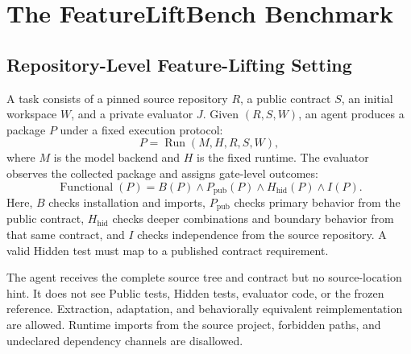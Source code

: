 \section{The FeatureLiftBench Benchmark}
\label{sec:benchmark}

\subsection{Repository-Level Feature-Lifting Setting}

A task consists of a pinned source repository $R$, a public contract $S$, an
initial workspace $W$, and a private evaluator $J$. Given $(R,S,W)$, an agent
produces a package $P$ under a fixed execution protocol:
\begin{equation}
  P = \operatorname{Run}(M, H, R, S, W),
  \label{eq:run}
\end{equation}
where $M$ is the model backend and $H$ is the fixed \mainprotocol runtime. The
evaluator observes the collected package and assigns gate-level outcomes:
\begin{equation}
  \operatorname{Functional}(P)
  = B(P) \land P_{\mathrm{pub}}(P)
    \land H_{\mathrm{hid}}(P) \land I(P).
  \label{eq:functional}
\end{equation}
Here, $B$ checks installation and imports, $P_{\mathrm{pub}}$ checks primary
behavior from the public contract, $H_{\mathrm{hid}}$ checks deeper
combinations and boundary behavior from that same contract, and $I$ checks
independence from the source repository. A valid Hidden test must map to a
published contract requirement.

The agent receives the complete source tree and contract but no source-location
hint. It does not see Public tests, Hidden tests, evaluator code, or the frozen
reference. Extraction, adaptation, and behaviorally equivalent reimplementation
are allowed. Runtime imports from the source project, forbidden paths, and
undeclared dependency channels are disallowed.

